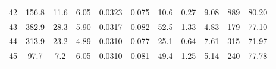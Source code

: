 \begin{table}[h]
\begin{tabular}{ccccccccccc}
42                                                     & 156.8                  & 11.6                                                                   & 6.05                                                                   & 0.0323                                                              & 0.075                                                                & 10.6                                                                  & 0.27                                                               & 9.08                                                                & 889                                                                        & 80.20                                                                \\
43                                                     & 382.9                  & 28.3                                                                   & 5.90                                                                   & 0.0317                                                              & 0.082                                                                & 52.5                                                                  & 1.33                                                               & 4.83                                                                & 179                                                                        & 77.10                                                                \\
44                                                     & 313.9                  & 23.2                                                                   & 4.89                                                                   & 0.0310                                                              & 0.077                                                                & 25.1                                                                  & 0.64                                                               & 7.61                                                                & 315                                                                        & 71.97                                                                \\
45                                                     & 97.7                   & 7.2                                                                    & 6.05                                                                   & 0.0310                                                              & 0.081                                                                & 49.4                                                                  & 1.25                                                               & 5.14                                                                & 240                                                                        & 77.78                                                                \\

\end{tabular}
\end{table}
